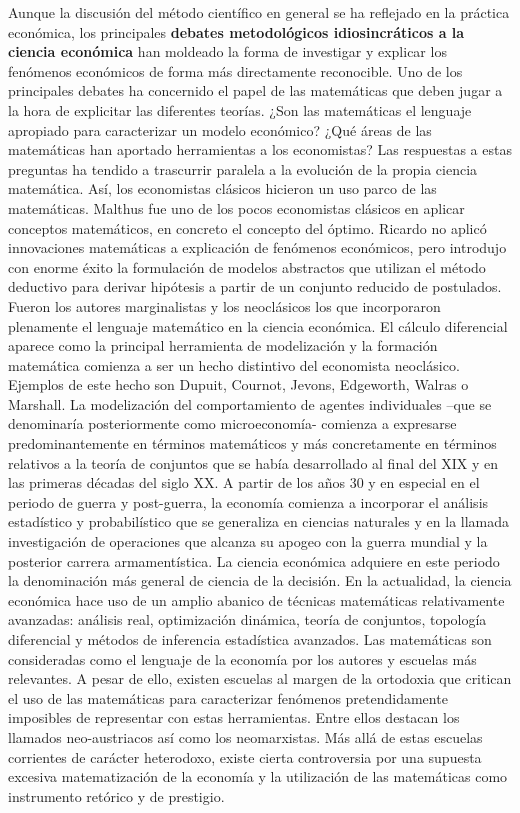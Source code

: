 \documentclass{nuevotema}
\begin{document}
Aunque la discusión del método científico en general se ha reflejado en la práctica económica, los principales \textbf{debates metodológicos idiosincráticos a la ciencia económica} han moldeado la forma de investigar y explicar los fenómenos económicos de forma más directamente reconocible. Uno de los principales debates ha concernido el papel de las matemáticas que deben jugar a la hora de explicitar las diferentes teorías. ¿Son las matemáticas el lenguaje apropiado para caracterizar un modelo económico? ¿Qué áreas de las matemáticas han aportado herramientas a los economistas? Las respuestas a estas preguntas ha tendido a trascurrir paralela a la evolución de la propia ciencia matemática. Así, los economistas clásicos hicieron un uso parco de las matemáticas. Malthus fue uno de los pocos economistas clásicos en aplicar conceptos matemáticos, en concreto el concepto del óptimo. Ricardo no aplicó innovaciones matemáticas a explicación de fenómenos económicos, pero introdujo con enorme éxito la formulación de modelos abstractos que utilizan el método deductivo para derivar hipótesis a partir de un conjunto reducido de postulados. Fueron los autores marginalistas y los neoclásicos los que incorporaron plenamente el lenguaje matemático en la ciencia económica. El cálculo diferencial aparece como la principal herramienta de modelización y la formación matemática comienza a ser un hecho distintivo del economista neoclásico. Ejemplos de este hecho son Dupuit, Cournot, Jevons, Edgeworth, Walras o Marshall. La modelización del comportamiento de agentes individuales --que se denominaría posteriormente como microeconomía- comienza a expresarse predominantemente en términos matemáticos y más concretamente en términos relativos a la teoría de conjuntos que se había desarrollado al final del XIX y en las primeras décadas del siglo XX. A partir de los años 30 y en especial en el periodo de guerra y post-guerra, la economía comienza a incorporar el análisis estadístico y probabilístico que se generaliza en ciencias naturales y en la llamada investigación de operaciones que alcanza su apogeo con la guerra mundial y la posterior carrera armamentística. La ciencia económica adquiere en este periodo la denominación más general de ciencia de la decisión. En la actualidad, la ciencia económica hace uso de un amplio abanico de técnicas matemáticas relativamente avanzadas: análisis real, optimización dinámica, teoría de conjuntos, topología diferencial y métodos de inferencia estadística avanzados. Las matemáticas son consideradas como el lenguaje de la economía por los autores y escuelas más relevantes. A pesar de ello, existen escuelas al margen de la ortodoxia que critican el uso de las matemáticas para caracterizar fenómenos pretendidamente imposibles de representar con estas herramientas. Entre ellos destacan los llamados neo-austriacos así como los neomarxistas. Más allá de estas escuelas corrientes de carácter heterodoxo, existe cierta controversia por una supuesta excesiva matematización de la economía y la utilización de las matemáticas como instrumento retórico y de prestigio. 
\end{document}
